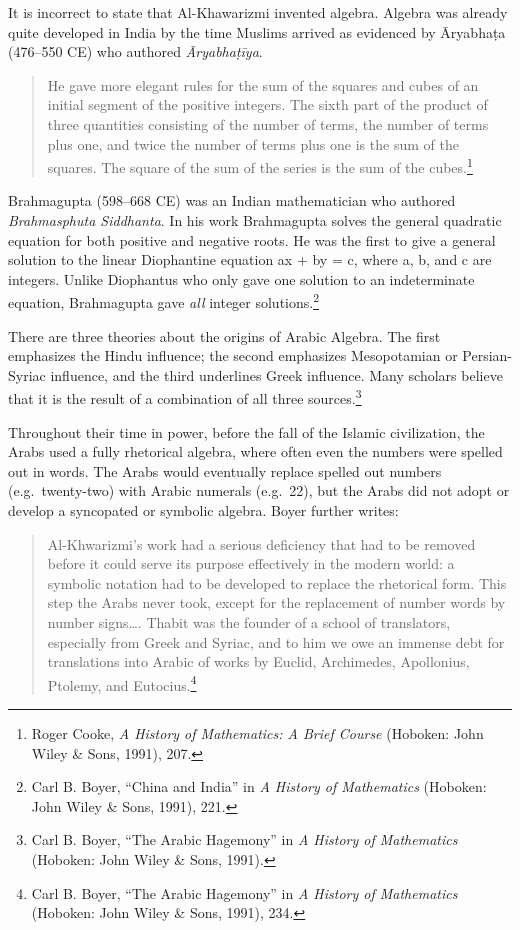 It is incorrect to state that Al-Khawarizmi invented algebra. Algebra was already quite developed in India by the time Muslims arrived as evidenced by Āryabhaṭa (476–550 CE) who authored \textit{Āryabhaṭīya}. 
\begin{quote}
He gave more elegant rules for the sum of the squares and cubes of an initial segment of the positive integers. The sixth part of the product of three quantities consisting of the number of terms, the number of terms plus one, and twice the number of terms plus one is the sum of the squares. The square of the sum of the series is the sum of the cubes.\footnote{Roger Cooke, \textit{A History of Mathematics: A Brief Course} (Hoboken: John Wiley \& Sons, 1991), 207.}
\end{quote}
Brahmagupta (598--668 CE) was an Indian mathematician who authored \textit{Brahmasphuta Siddhanta}. In his work Brahmagupta solves the general quadratic equation for both positive and negative roots. He was the first to give a general solution to the linear Diophantine equation ax + by = c, where a, b, and c are integers. Unlike Diophantus who only gave one solution to an indeterminate equation, Brahmagupta gave \textit{all} integer solutions.\footnote{Carl B. Boyer, “China 	and India” in \textit{A History of Mathematics}  (Hoboken: John Wiley \& Sons, 1991), 221.}

There are three theories about the origins of Arabic Algebra. The first emphasizes the Hindu influence; the second emphasizes Mesopotamian or Persian-Syriac influence, and the third underlines Greek influence. Many scholars believe that it is the result of a combination of all three sources.\footnote{Carl B. Boyer, “The 	Arabic Hagemony” in \textit{A History of Mathematics} (Hoboken: John Wiley \& Sons, 1991).} 

Throughout their time in power, before the fall of the Islamic civilization, the Arabs used a fully rhetorical algebra, where often even the numbers were spelled out in words. The Arabs would eventually replace spelled out numbers (e.g.\ twenty-two) with Arabic numerals (e.g.\ 22), but the Arabs did not adopt or develop a syncopated or symbolic algebra. Boyer further writes:
\begin{quote}
Al-Khwarizmi's work had a serious deficiency that had to be removed before it could serve its purpose effectively in the modern world: a symbolic notation had to be developed to replace the rhetorical form. This step the Arabs never took, except for the replacement of number words by number signs…. Thabit was the founder of a school of translators, especially from Greek and Syriac, and to him we owe an immense debt for translations into Arabic of works by Euclid, Archimedes, Apollonius, Ptolemy, and Eutocius.\footnote{Carl B. Boyer, “The Arabic Hagemony” in \textit{A History of Mathematics} (Hoboken: John Wiley \& Sons, 1991), 234.}
\end{quote}

